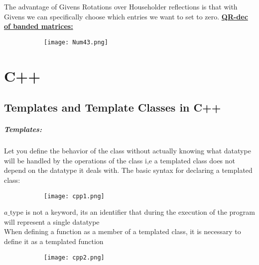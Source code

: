 \documentclass[8pt]{extreport}
\begin{document}
The advantage of Givens Rotations over Householder reflections is that with Givens we can specifically choose which entries we want to set to zero.
\underline{\textbf{QR-dec of banded matrices:}}
\begin{figure}[H]
\centering
\begin{subfigure}[b]{0.32\linewidth}
\texttt{[image: Num43.png]}
\end{subfigure}
\end{figure}

















\chapter{C++}

\section{Templates and Template Classes in C++} 

\paragraph{Templates:} Let you define the behavior of the class without actually knowing what datatype will be handled by the operations of the class i,e a templated class does not depend on the datatype it deals with. The basic syntax for declaring a templated class:
\begin{figure}[H]
\centering
\begin{subfigure}[b]{0.4\linewidth}
\texttt{[image: cpp1.png]}
\end{subfigure}
\end{figure}
$a\_$type is not a keyword, its an identifier that during the execution of the program will represent a single datatype\\

When defining a function as a member of a templated class, it is necessary to define it as a templated function
\begin{figure}[H]
\centering
\begin{subfigure}[b]{0.4\linewidth}
\texttt{[image: cpp2.png]}
\end{subfigure}
\end{figure}
\end{document}
